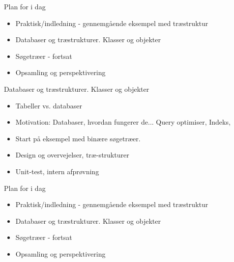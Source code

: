 \documentclass[a4paper,landscape]{slides}
\begin{document}
\begin{slide}
	\begin{center} {\large 
            Plan for i dag
	} \end{center}
	\begin{itemize} \addtolength{\itemsep}{-\baselineskip}
            \item Praktisk/indledning - gennemgående eksempel med træstruktur
            \item Databaser og træstrukturer. Klasser og objekter
            \item Søgetræer - fortsat
            \item Opsamling og perspektivering
	\end{itemize}
\end{slide}

\begin{slide}
	\begin{center} {\large 
            Databaser og træstrukturer. Klasser og objekter 
	} \end{center}
	\begin{itemize} \addtolength{\itemsep}{-\baselineskip}
            \item Tabeller vs. databaser 
            \item Motivation: Databaser, hvordan fungerer de... Query optimiser, Indeks, 
            \item Start på eksempel med binære søgetræer. 
            \item Design og overvejelser, træ-strukturer 
            \item Unit-test, intern afprøvning
	\end{itemize}
\end{slide}

\begin{slide}
	\begin{center} {\large 
            Plan for i dag
	} \end{center}
	\begin{itemize} \addtolength{\itemsep}{-\baselineskip}
            \item Praktisk/indledning - gennemgående eksempel med træstruktur
            \item Databaser og træstrukturer. Klasser og objekter
            \item Søgetræer - fortsat
            \item Opsamling og perspektivering
	\end{itemize}
\end{slide}
\end{document}
